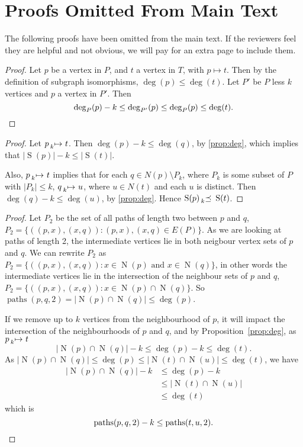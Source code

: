 \documentclass[letterpaper]{article}
\theoremstyle{definition}
\newcommand{\paths}{\operatorname{paths}}
\newcommand{\lessmap}[1]{\prescript{}{#1}{\mapsto}\ }
\newcommand{\lesspreceq}[1]{\prescript{}{#1}{\preceq}\ }
\newcommand{\N}{\operatorname{N}}
\newcommand{\nds}{\operatorname{S}}
\begin{document}



\clearpage
\appendix

\section{Proofs Omitted From Main Text}

The following proofs have been omitted from the main text. If the reviewers feel they are helpful
and not obvious, we will pay for an extra page to include them.

\bigskip

\propdeg*
\begin{proof}
Let $p$ be a vertex in $P$, and $t$ a vertex in $T$, with $p\mapsto t$. Then by the definition of subgraph isomorphisms, $\deg(p) \le \deg(t)$. Let $P'$ be $P$ less $k$ vertices and $p$ a vertex in $P'$. Then
\[
\deg_{P}(p)-k \le \deg_{P'}(p) \le \deg_{P}(p) \le \deg(t). \qedhere
\]
\end{proof}

\bigskip

\propnds*
\begin{proof}
Let $p \lessmap{k} t$.  Then $\deg(p) - k \leq \deg(q)$, by \cref{prop:deg}, which
implies that $\left|\nds(p)\right| -k \leq \left| \nds(t) \right| $.

Also, $p \lessmap{k} t$ implies that for each $q \in N(p) \setminus P_k$, where $P_k$
is some subset of $P$ with $\left| P_k \right| \leq k$, $q \lessmap{k} u$, where $u \in N(t)$ and
each $u$ is distinct.  Then $\deg(q) - k \leq \deg(u)$, by \cref{prop:deg}.  Hence $\nds(p)
\lesspreceq{k} \nds(t)$.
\end{proof}

\bigskip

\proppaths*
\begin{proof}
Let $P_{2}$ be the set of all paths of length two between $p$ and $q$,
$P_{2} = \{((p,x),(x,q)) : (p,x),(x,q)\in E(P) \}$. As we are looking at paths of length 2, the
intermediate vertices lie in both neigbour vertex sets of $p$ and $q$. We can rewrite $P_{2}$ as
$P_{2} = \{((p,x),(x,q)) : x\in \N(p) \text{ and } x\in \N(q) \}$, in other words the intermediate vertices lie in the intersection of the neighbour sets of $p$ and $q$,
$P_{2}=\{((p,x),(x,q)) : x\in \N(p)\cap \N(q) \}$. So $\paths(p,q,2) = \left| \N(p)\cap \N(q) \right|  \leq \deg(p)$.

If we remove up to $k$ vertices from the neighbourhood of $p$, it will impact the intersection of the neighbourhoods of $p$ and $q$, and by Proposition~\ref{prop:deg}, as $p\lessmap{k}t$
\[
\left| \N(p)\cap \N(q)\right| - k \leq \deg(p) - k \leq \deg(t).
\]
As $\left|\N(p)\cap \N(q)\right|\leq \deg(p) \leq \left|\N(t)\cap \N(u)\right|\leq \deg(t)$, we have
\begin{align*}
\left|\N(p)\cap \N(q)\right| - k & \leq \deg(p) - k \\
 & \leq \left|\N(t)\cap \N(u)\right|\\
 & \leq \deg(t)
\end{align*}
which is
\[
\paths(p, q, 2) - k \leq \paths(t, u, 2). \qedhere
\]
\end{proof}
\end{document}
